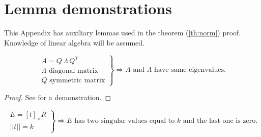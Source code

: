 \chapter{Lemma demonstrations}
\label{ap:proof}

This Appendix has auxiliary lemmas used in the theorem (\ref{th:norm}) proof. Knowledge of linear algebra will be assumed.


\begin{lemma}
\label{lemma:symmetric}
\[ \left.
  \begin{array}{l}
  A = Q\,\Lambda\,Q^T \\
  \Lambda \mbox{ diagonal matrix} \\
  Q \mbox{ symmetric matrix}
  \end{array} \right\}
  \Rightarrow
  A \mbox{ and } \Lambda \mbox{ have same eigenvalues.}
\]
\end{lemma}

\begin{proof} See \cite{Strang:1993} for a demonstration.
\end{proof}


\begin{lemma}
\label{lemma:singular_values}
\[ \left.
  \begin{array}{l}
  E =[t]_{\times}R \\
  ||t||=k
  \end{array} \right\}
  \Rightarrow
  E \mbox{ has two singular values equal to $k$ and the last one is zero.}
\]
\end{lemma}

